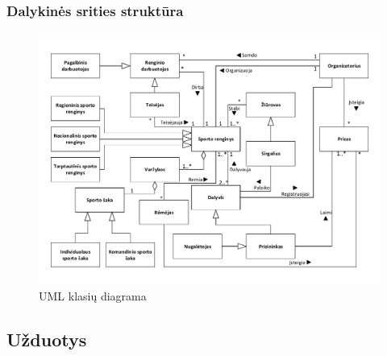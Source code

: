 \documentclass{VUMIFPSkursinis}
\begin{document}
    \subsubsection*{Dalykinės srities struktūra} \label{vidineVersloProcesoAnalize_statineStruktura_dalykinesSritiesStruktura}
    \begin{figure}[H]
      \centering
      \includegraphics[width=\textwidth]{img/KlasiuDiagrama}
      \caption{UML klasių diagrama}
      \label{fig:klasiuDiagrama}
    \end{figure}
  \subsection{Užduotys} \label{vidineVersloProcesoAnalize_uzduotys}
\end{document}
